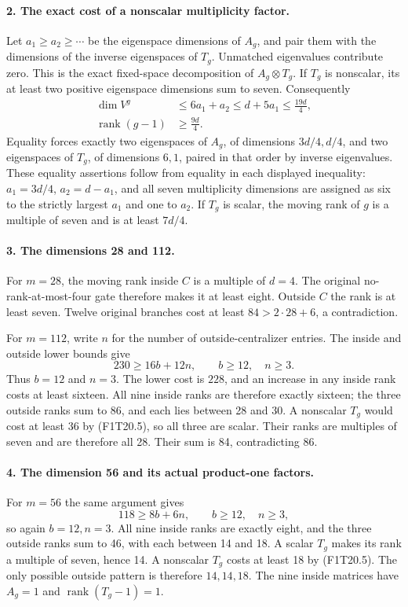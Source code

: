 \paragraph{2. The exact cost of a nonscalar multiplicity factor.}
Let \(a_1\ge a_2\ge\cdots\) be the eigenspace
dimensions of \(A_g\), and pair them with the dimensions
of the inverse eigenspaces of \(T_g\). Unmatched
eigenvalues contribute zero. This is the exact fixed-space
decomposition of \(A_g\otimes T_g\). If \(T_g\)
is nonscalar, its at least two positive eigenspace
dimensions sum to seven. Consequently
\[
 \begin{split}
 \dim V^g&\le6a_1+a_2
       \le d+5a_1\le\frac{19d}{4},\\
 \operatorname{rank}(g-1)&\ge\frac{9d}{4}.
 \end{split}
 \tag{F1T20.5}
\]
Equality forces exactly two eigenspaces of \(A_g\),
of dimensions \(3d/4,d/4\), and two eigenspaces of
\(T_g\), of dimensions \(6,1\), paired in that
order by inverse eigenvalues. These equality assertions
follow from equality in each displayed inequality:
\(a_1=3d/4\), \(a_2=d-a_1\), and all seven
multiplicity dimensions are assigned as six to the
strictly largest \(a_1\) and one to \(a_2\).
If \(T_g\) is scalar, the moving rank of \(g\)
is a multiple of seven and is at least \(7d/4\).

\paragraph{3. The dimensions 28 and 112.}
For \(m=28\), the moving rank inside \(C\) is a
multiple of \(d=4\). The original no-rank-at-most-four
gate therefore makes it at least eight. Outside \(C\)
the rank is at least seven. Twelve original branches
cost at least \(84>2\cdot28+6\), a contradiction.

For \(m=112\), write \(n\) for the number of
outside-centralizer entries. The inside and outside
lower bounds give
\[
       230\ge16b+12n,\qquad b\ge12,\quad n\ge3.
 \tag{F1T20.6}
\]
Thus \(b=12\) and \(n=3\). The lower cost is
\(228\), and an increase in any inside rank costs
at least sixteen. All nine inside ranks are therefore
exactly sixteen; the three outside ranks sum to 86,
and each lies between 28 and 30. A nonscalar \(T_g\)
would cost at least 36 by (F1T20.5), so all three
are scalar. Their ranks are multiples of seven and
are therefore all 28. Their sum is 84, contradicting 86.

\paragraph{4. The dimension 56 and its actual product-one factors.}
For \(m=56\) the same argument gives
\[
       118\ge8b+6n,\qquad b\ge12,\quad n\ge3,
 \tag{F1T20.7}
\]
so again \(b=12,n=3\). All nine inside ranks are
exactly eight, and the three outside ranks sum to 46,
with each between 14 and 18. A scalar \(T_g\) makes
its rank a multiple of seven, hence 14. A nonscalar
\(T_g\) costs at least 18 by (F1T20.5). The only
possible outside pattern is therefore \(14,14,18\).
The nine inside matrices have \(A_g=1\) and
\(\operatorname{rank}(T_g-1)=1\).

